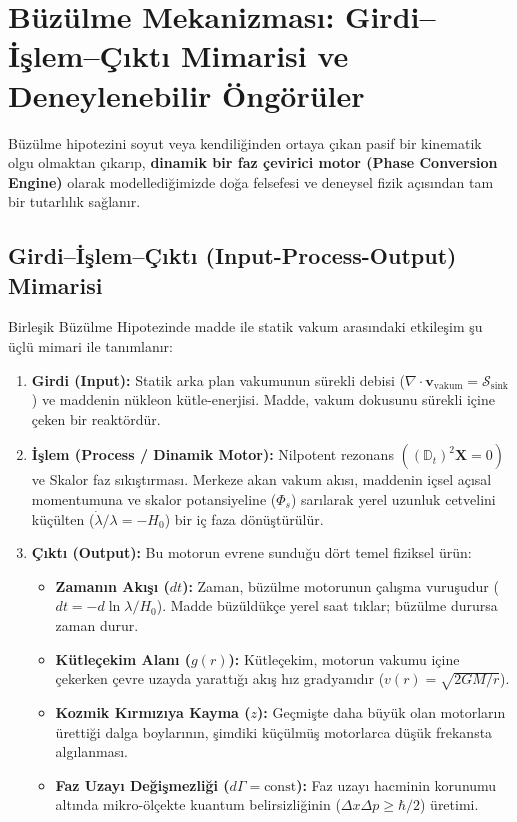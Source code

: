 \section{Büzülme Mekanizması: Girdi--İşlem--Çıktı Mimarisi ve Deneylenebilir Öngörüler}
\label{sec:mekanizma_ve_deneyler}


Büzülme hipotezini soyut veya kendiliğinden ortaya çıkan pasif bir kinematik olgu olmaktan çıkarıp, \textbf{dinamik bir faz çevirici motor (Phase Conversion Engine)} olarak modellediğimizde doğa felsefesi ve deneysel fizik açısından tam bir tutarlılık sağlanır.

\subsection{Girdi--İşlem--Çıktı (Input-Process-Output) Mimarisi}
\label{sec:input_output_mimari}

Birleşik Büzülme Hipotezinde madde ile statik vakum arasındaki etkileşim şu üçlü mimari ile tanımlanır:
\begin{enumerate}
    \item \textbf{Girdi (Input):} Statik arka plan vakumunun sürekli debisi ($\nabla \cdot \mathbf{v}_{\mathrm{vakum}} = \mathcal{S}_{\mathrm{sink}}$) ve maddenin nükleon kütle-enerjisi. Madde, vakum dokusunu sürekli içine çeken bir reaktördür.
    \item \textbf{İşlem (Process / Dinamik Motor):} Nilpotent rezonans $((\mathbb{D}_t)^2 \mathbf{X} = 0)$ ve Skalor faz sıkıştırması. Merkeze akan vakum akısı, maddenin içsel açısal momentumuna ve skalor potansiyeline ($\Phi_s$) sarılarak yerel uzunluk cetvelini küçülten ($\dot{\lambda}/\lambda = -H_0$) bir iç faza dönüştürülür.
    \item \textbf{Çıktı (Output):} Bu motorun evrene sunduğu dört temel fiziksel ürün:
          \begin{itemize}
              \item \textbf{Zamanın Akışı ($dt$):} Zaman, büzülme motorunun çalışma vuruşudur ($dt = -d\ln\lambda / H_0$). Madde büzüldükçe yerel saat tıklar; büzülme durursa zaman durur.
              \item \textbf{Kütleçekim Alanı ($g(r)$):} Kütleçekim, motorun vakumu içine çekerken çevre uzayda yarattığı akış hız gradyanıdır ($v(r) = \sqrt{2GM/r}$).
              \item \textbf{Kozmik Kırmızıya Kayma ($z$):} Geçmişte daha büyük olan motorların ürettiği dalga boylarının, şimdiki küçülmüş motorlarca düşük frekansta algılanması.
              \item \textbf{Faz Uzayı Değişmezliği ($d\Gamma = \text{const}$):} Faz uzayı hacminin korunumu altında mikro-ölçekte kuantum belirsizliğinin ($\Delta x \Delta p \ge \hbar/2$) üretimi.
          \end{itemize}
\end{enumerate}

